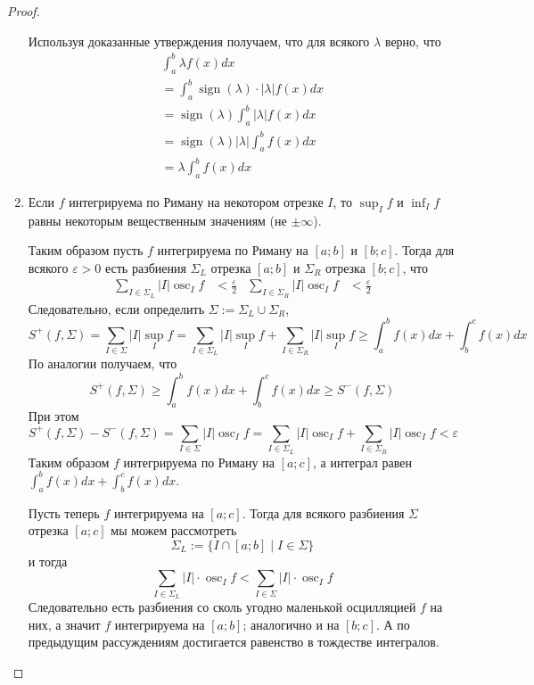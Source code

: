 \documentclass[12pt,a4paper]{article}
\DeclareMathOperator*{\osc}{osc}
\DeclareMathOperator{\sign}{sign}
\begin{document}
\begin{proof}
\begin{enumerate}
                Используя доказанные утверждения получаем, что для всякого $\lambda$ верно, что
                \begin{multline*}
                    \int_a^b \lambda f(x)dx\\
                    = \int_a^b \sign(\lambda)\cdot |\lambda| f(x)dx\\
                    = \sign(\lambda) \int_a^b |\lambda| f(x)dx\\
                    = \sign(\lambda)|\lambda| \int_a^b f(x)dx\\
                    = \lambda \int_a^b f(x)dx
                \end{multline*}

            \item Если $f$ интегрируема по Риману на некотором отрезке $I$, то $\sup_I f$ и $\inf_I f$ равны некоторым вещественным значениям (не $\pm\infty$).

                Таким образом пусть $f$ интегрируема по Риману на $[a; b]$ и $[b; c]$. Тогда для всякого $\varepsilon > 0$ есть разбиения $\Sigma_L$ отрезка $[a; b]$ и $\Sigma_R$ отрезка $[b; c]$, что
                \begin{align*}
                    \sum_{I \in \Sigma_L} |I| \osc_I f &< \frac{\varepsilon}{2}&
                    \sum_{I \in \Sigma_R} |I| \osc_I f &< \frac{\varepsilon}{2}
                \end{align*}
                Следовательно, если определить $\Sigma := \Sigma_L \cup \Sigma_R$,
                \[
                    S^+(f, \Sigma)
                    = \sum_{I \in \Sigma} |I| \sup_I f
                    = \sum_{I \in \Sigma_L} |I| \sup_I f + \sum_{I \in \Sigma_R} |I| \sup_I f
                    \geqslant \int_a^b f(x)dx + \int_b^c f(x)dx
                \]
                По аналогии получаем, что
                \[S^+(f, \Sigma) \geqslant \int_a^b f(x)dx + \int_b^c f(x)dx \geqslant S^-(f, \Sigma)\]
                При этом
                \[
                    S^+(f, \Sigma) - S^-(f, \Sigma)
                    = \sum_{I \in \Sigma} |I| \osc_I f
                    = \sum_{I \in \Sigma_L} |I| \osc_I f + \sum_{I \in \Sigma_R} |I| \osc_I f
                    < \varepsilon
                \]
                Таким образом $f$ интегрируема по Риману на $[a; c]$, а интеграл равен $\int_a^b f(x)dx + \int_b^c f(x)dx$.

                Пусть теперь $f$ интегрируема на $[a; c]$. Тогда для всякого разбиения $\Sigma$ отрезка $[a; c]$ мы можем рассмотреть
                \[\Sigma_L := \{I \cap [a; b] \mid I \in \Sigma\}\]
                и тогда
                \[\sum_{I \in \Sigma_L} |I| \cdot \osc_I f < \sum_{I \in \Sigma} |I| \cdot \osc_I f\]
                Следовательно есть разбиения со сколь угодно маленькой осцилляцией $f$ на них, а значит $f$ интегрируема на $[a; b]$; аналогично и на $[b; c]$. А по предыдущим рассуждениям достигается равенство в тождестве интегралов.
        \end{enumerate}
    \end{proof}
\end{document}
